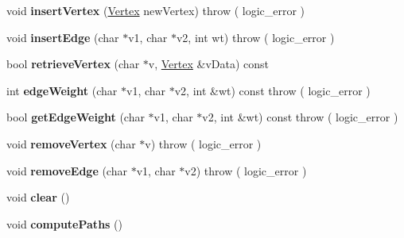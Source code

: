 \begin{DoxyCompactItemize}
\item 
\hypertarget{class_weighted_graph_a164845f6fecf25a25f5f14f69d42d975}{void {\bfseries insert\+Vertex} (\hyperlink{class_weighted_graph_1_1_vertex}{Vertex} new\+Vertex)  throw ( logic\+\_\+error )}\label{class_weighted_graph_a164845f6fecf25a25f5f14f69d42d975}

\item 
\hypertarget{class_weighted_graph_ad5e4bb96c2b3b5ace4be251bb3b47621}{void {\bfseries insert\+Edge} (char $\ast$v1, char $\ast$v2, int wt)  throw ( logic\+\_\+error )}\label{class_weighted_graph_ad5e4bb96c2b3b5ace4be251bb3b47621}

\item 
\hypertarget{class_weighted_graph_add447f0f2354c8c776045bf3bec865d8}{bool {\bfseries retrieve\+Vertex} (char $\ast$v, \hyperlink{class_weighted_graph_1_1_vertex}{Vertex} \&v\+Data) const }\label{class_weighted_graph_add447f0f2354c8c776045bf3bec865d8}

\item 
\hypertarget{class_weighted_graph_a80b2b095e7a05df4841383d2067e4345}{int {\bfseries edge\+Weight} (char $\ast$v1, char $\ast$v2, int \&wt) const   throw ( logic\+\_\+error )}\label{class_weighted_graph_a80b2b095e7a05df4841383d2067e4345}

\item 
\hypertarget{class_weighted_graph_a0ff5197e169472040ab88b81049340d9}{bool {\bfseries get\+Edge\+Weight} (char $\ast$v1, char $\ast$v2, int \&wt) const   throw ( logic\+\_\+error )}\label{class_weighted_graph_a0ff5197e169472040ab88b81049340d9}

\item 
\hypertarget{class_weighted_graph_a0eb59d893befdedcda67add1466b9fdd}{void {\bfseries remove\+Vertex} (char $\ast$v)  throw ( logic\+\_\+error )}\label{class_weighted_graph_a0eb59d893befdedcda67add1466b9fdd}

\item 
\hypertarget{class_weighted_graph_ad06596ac31405f02f39e482860ebe3a8}{void {\bfseries remove\+Edge} (char $\ast$v1, char $\ast$v2)  throw ( logic\+\_\+error )}\label{class_weighted_graph_ad06596ac31405f02f39e482860ebe3a8}

\item 
\hypertarget{class_weighted_graph_a26890ebf74d23821a6e4dbcf803b5002}{void {\bfseries clear} ()}\label{class_weighted_graph_a26890ebf74d23821a6e4dbcf803b5002}

\item 
\hypertarget{class_weighted_graph_aeaea1bd5b1e14b69f2155613bfd25d68}{void {\bfseries compute\+Paths} ()}\label{class_weighted_graph_aeaea1bd5b1e14b69f2155613bfd25d68}


\end{DoxyCompactItemize}
